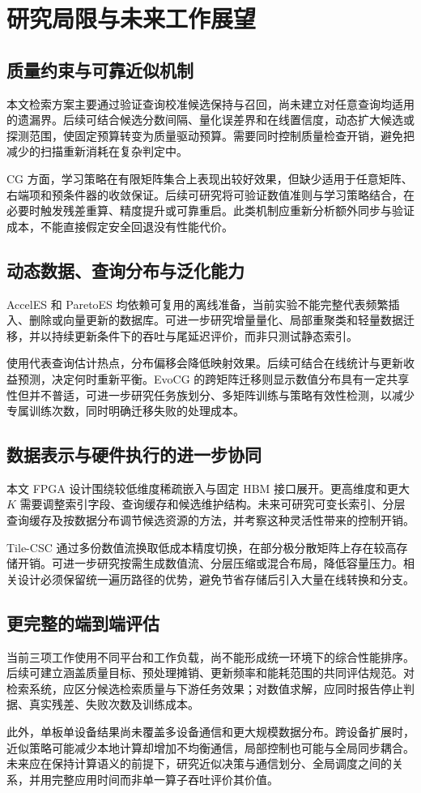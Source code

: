 \section{研究局限与未来工作展望}
\subsection{质量约束与可靠近似机制}
本文检索方案主要通过验证查询校准候选保持与召回，尚未建立对任意查询均适用的遗漏界。后续可结合候选分数间隔、量化误差界和在线置信度，动态扩大候选或探测范围，使固定预算转变为质量驱动预算。需要同时控制质量检查开销，避免把减少的扫描重新消耗在复杂判定中。

CG 方面，学习策略在有限矩阵集合上表现出较好效果，但缺少适用于任意矩阵、右端项和预条件器的收敛保证。后续可研究将可验证数值准则与学习策略结合，在必要时触发残差重算、精度提升或可靠重启。此类机制应重新分析额外同步与验证成本，不能直接假定安全回退没有性能代价。

\subsection{动态数据、查询分布与泛化能力}
AccelES 和 ParetoES 均依赖可复用的离线准备，当前实验不能完整代表频繁插入、删除或向量更新的数据库。可进一步研究增量量化、局部重聚类和轻量数据迁移，并以持续更新条件下的吞吐与尾延迟评价，而非只测试静态索引。

\hbalance{}使用代表查询估计热点，分布偏移会降低映射效果。后续可结合在线统计与更新收益预测，决定何时重新平衡。EvoCG 的跨矩阵迁移则显示数值分布具有一定共享性但并不普适，可进一步研究任务族划分、多矩阵训练与策略有效性检测，以减少专属训练次数，同时明确迁移失败的处理成本。

\subsection{数据表示与硬件执行的进一步协同}
本文 FPGA 设计围绕较低维度稀疏嵌入与固定 HBM 接口展开。更高维度和更大 $K$ 需要调整索引字段、查询缓存和候选维护结构。未来可研究可变长索引、分层查询缓存及按数据分布调节候选资源的方法，并考察这种灵活性带来的控制开销。

Tile-CSC 通过多份数值流换取低成本精度切换，在部分极分散矩阵上存在较高存储开销。可进一步研究按需生成数值流、分层压缩或混合布局，降低容量压力。相关设计必须保留统一遍历路径的优势，避免节省存储后引入大量在线转换和分支。

\subsection{更完整的端到端评估}
当前三项工作使用不同平台和工作负载，尚不能形成统一环境下的综合性能排序。后续可建立涵盖质量目标、预处理摊销、更新频率和能耗范围的共同评估规范。对检索系统，应区分候选检索质量与下游任务效果；对数值求解，应同时报告停止判据、真实残差、失败次数及训练成本。

此外，单板单设备结果尚未覆盖多设备通信和更大规模数据分布。跨设备扩展时，近似策略可能减少本地计算却增加不均衡通信，局部控制也可能与全局同步耦合。未来应在保持计算语义的前提下，研究近似决策与通信划分、全局调度之间的关系，并用完整应用时间而非单一算子吞吐评价其价值。

